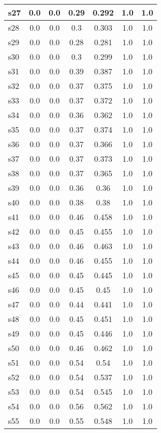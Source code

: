 \documentclass{article}
\begin{document}
\begin{tabular}{|l|c|c|c|c|c|c|}
s27 &0.0 & 0.0 & 0.29 & 0.292 & 1.0 & 1.0\\
\hline
s28 &0.0 & 0.0 & 0.3 & 0.303 & 1.0 & 1.0\\
\hline
s29 &0.0 & 0.0 & 0.28 & 0.281 & 1.0 & 1.0\\
\hline
s30 &0.0 & 0.0 & 0.3 & 0.299 & 1.0 & 1.0\\
\hline
s31 &0.0 & 0.0 & 0.39 & 0.387 & 1.0 & 1.0\\
\hline
s32 &0.0 & 0.0 & 0.37 & 0.375 & 1.0 & 1.0\\
\hline
s33 &0.0 & 0.0 & 0.37 & 0.372 & 1.0 & 1.0\\
\hline
s34 &0.0 & 0.0 & 0.36 & 0.362 & 1.0 & 1.0\\
\hline
s35 &0.0 & 0.0 & 0.37 & 0.374 & 1.0 & 1.0\\
\hline
s36 &0.0 & 0.0 & 0.37 & 0.366 & 1.0 & 1.0\\
\hline
s37 &0.0 & 0.0 & 0.37 & 0.373 & 1.0 & 1.0\\
\hline
s38 &0.0 & 0.0 & 0.37 & 0.365 & 1.0 & 1.0\\
\hline
s39 &0.0 & 0.0 & 0.36 & 0.36 & 1.0 & 1.0\\
\hline
s40 &0.0 & 0.0 & 0.38 & 0.38 & 1.0 & 1.0\\
\hline
s41 &0.0 & 0.0 & 0.46 & 0.458 & 1.0 & 1.0\\
\hline
s42 &0.0 & 0.0 & 0.45 & 0.455 & 1.0 & 1.0\\
\hline
s43 &0.0 & 0.0 & 0.46 & 0.463 & 1.0 & 1.0\\
\hline
s44 &0.0 & 0.0 & 0.46 & 0.455 & 1.0 & 1.0\\
\hline
s45 &0.0 & 0.0 & 0.45 & 0.445 & 1.0 & 1.0\\
\hline
s46 &0.0 & 0.0 & 0.45 & 0.45 & 1.0 & 1.0\\
\hline
s47 &0.0 & 0.0 & 0.44 & 0.441 & 1.0 & 1.0\\
\hline
s48 &0.0 & 0.0 & 0.45 & 0.451 & 1.0 & 1.0\\
\hline
s49 &0.0 & 0.0 & 0.45 & 0.446 & 1.0 & 1.0\\
\hline
s50 &0.0 & 0.0 & 0.46 & 0.462 & 1.0 & 1.0\\
\hline
s51 &0.0 & 0.0 & 0.54 & 0.54 & 1.0 & 1.0\\
\hline
s52 &0.0 & 0.0 & 0.54 & 0.537 & 1.0 & 1.0\\
\hline
s53 &0.0 & 0.0 & 0.54 & 0.545 & 1.0 & 1.0\\
\hline
s54 &0.0 & 0.0 & 0.56 & 0.562 & 1.0 & 1.0\\
\hline
s55 &0.0 & 0.0 & 0.55 & 0.548 & 1.0 & 1.0\\

\end{tabular}
\end{document}
